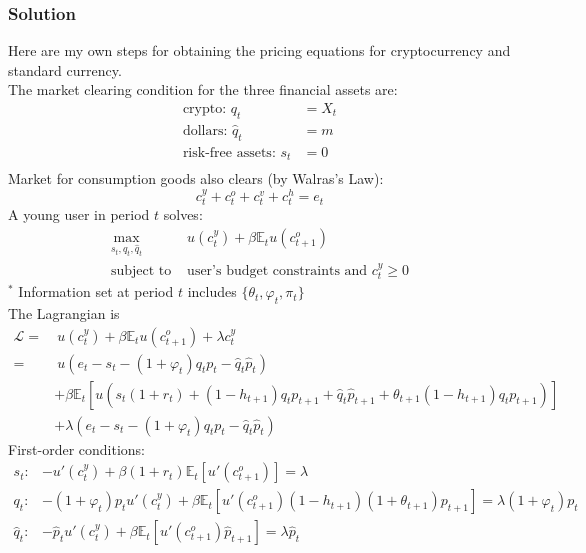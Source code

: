 \documentclass[12pt]{article}
\begin{document}
\subsubsection{Solution}
Here are my own steps for obtaining the pricing equations for cryptocurrency and standard currency.\\
The market clearing condition for the three financial assets are:
\begin{align}
    \text{crypto: } q_t &= X_t \\
    \text{dollars: } \hat{q}_t &= m \\
    \text{risk-free assets: } s_t &= 0 \\
\end{align}
Market for consumption goods also clears (by Walras's Law):
\begin{equation}
    c_t^y + c_t^o + c_t^v + c_t^h = e_t
\end{equation}
A young user in period $t$ solves:
\begin{align}
\max_{s_t, q_t, \hat{q}_t} &u(c_t^y) + \beta\mathbb{E}_t u(c_{t+1}^o)\\  
    \text{subject to  } & \text{user's budget constraints and } c_t^y \geq0 \nonumber
\end{align}
$^*$ Information set at period $t$ includes $ \{\theta_t, \varphi_t, \pi_t\}$ \\
The Lagrangian is
\begin{align}
    \mathcal{L} = &\ u(c_t^y) + \beta\mathbb{E}_t u(c_{t+1}^o) +\lambda c_t^y \nonumber \\ 
    = &\ u(e_t- s_t - (1+\varphi_t) q_t p_t - \hat{q}_t \hat{p}_t) \nonumber \\
    & + \beta \mathbb{E}_t\left[u(s_t (1+r_t) + (1-h_{t+1}) q_t p_{t+1} + \hat{q}_t \hat{p}_{t+1}
    + \theta_{t+1} (1-h_{t+1}) q_t p_{t+1}  ) \right] \nonumber \\
    & + \lambda (e_t- s_t - (1+\varphi_t) q_t p_t - \hat{q}_t \hat{p}_t)
\end{align}
First-order conditions:
\begin{align}
    s_t: & -u'(c_t^y) + \beta(1+r_t) \mathbb{E}_t[u'(c_{t+1}^o)] = \lambda\\
    q_t: & -(1+\varphi_t) p_t  u'(c_t^y) + \beta \mathbb{E}_t[u'(c_{t+1}^o)(1-h_{t+1})(1+\theta_{t+1})p_{t+1}] = \lambda (1+\varphi_t) p_t \\
    \hat{q}_t: & -\hat{p}_t u'(c_t^y) + \beta \mathbb{E}_t[u'(c_{t+1}^o) \hat{p}_{t+1}] = \lambda \hat{p}_t
\end{align}
\end{document}
